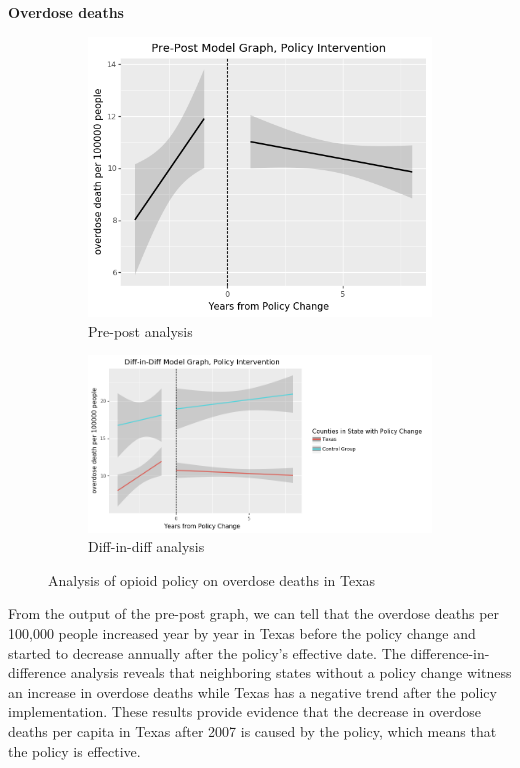 \documentclass[12pt,letterpaper]{article}
\begin{document}
\noindent \textbf{Overdose deaths}

\begin{figure}[!h]
\centering
\begin{subfigure}{.5\textwidth}
  \centering
  \includegraphics[width=0.7\linewidth]{../30_results/General_Results/texas_overdose_death_prepost.png}
  \caption{Pre-post analysis}
  \label{fig:tx_death_prepost}
\end{subfigure}%
\begin{subfigure}{.55\textwidth}
  \centering
  \includegraphics[width=1\linewidth]{../30_results/General_Results/texas_overdose_death_diffdiff.png}
  \caption{Diff-in-diff analysis}
  \label{fig:tx_death_did}
\end{subfigure}
\caption{Analysis of opioid policy on overdose deaths in Texas}
\label{fig:tx_death}
\end{figure}

From the output of the pre-post graph, we can tell that the overdose deaths per 100,000 people increased year by year in Texas before the policy change and started to decrease annually after the policy's effective date. The difference-in-difference analysis reveals that neighboring states without a policy change witness an increase in overdose deaths while Texas has a negative trend after the policy implementation. These results provide evidence that the decrease in overdose deaths per capita in Texas after 2007 is caused by the policy, which means that the policy is effective.
\end{document}
